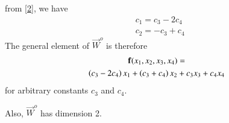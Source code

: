 \documentclass[journal,12pt,twocolumn]{IEEEtran}
\begin{document}
from \eqref{2}, we have
\begin{align}
& c_1 = c_3 - 2c_4 \\
& c_2 = -c_3 + c_4
\end{align}
The general element of $\vec{W}^{o}$ is therefore
\begin{multline}
\mathbf{f}(x_1,x_2,x_3,x_4) =\\
\left(c_3 - 2c_4\right)x_1 + \left(c_3 + c_4\right)x_2 + c_3x_3 + c_4x_4
\end{multline}
for arbitrary constants $c_3$ and $c_4$. 

Also, $\vec{W}^{o}$ has dimension 2.
\end{document}
